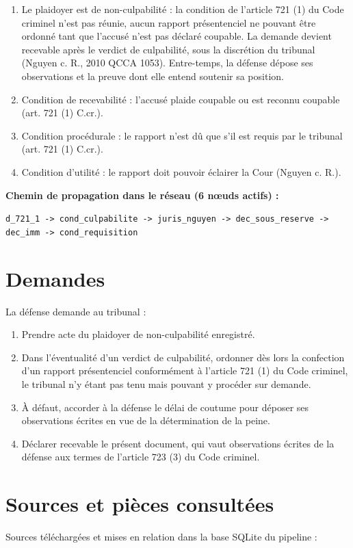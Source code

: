\documentclass[12pt,a4paper]{article}
\begin{document}
\begin{enumerate}[leftmargin=*]
\item Le plaidoyer est de non-culpabilité : la condition de l'article 721 (1) du Code criminel n'est pas réunie, aucun rapport présentenciel ne pouvant être ordonné tant que l'accusé n'est pas déclaré coupable. La demande devient recevable après le verdict de culpabilité, sous la discrétion du tribunal (Nguyen c. R., 2010 QCCA 1053). Entre-temps, la défense dépose ses observations et la preuve dont elle entend soutenir sa position.
\item Condition de recevabilité : l'accusé plaide coupable ou est reconnu coupable (art. 721 (1) C.cr.).
\item Condition procédurale : le rapport n'est dû que s'il est requis par le tribunal (art. 721 (1) C.cr.).
\item Condition d'utilité : le rapport doit pouvoir éclairer la Cour (Nguyen c. R.).
\end{enumerate}

\textbf{Chemin de propagation dans le réseau (6 nœuds actifs) :}

\texttt{d\_721\_1 -> cond\_culpabilite -> juris\_nguyen -> dec\_sous\_reserve -> dec\_imm -> cond\_requisition}


\section{Demandes}
La défense demande au tribunal :

\begin{enumerate}[leftmargin=*]
\item Prendre acte du plaidoyer de non-culpabilité enregistré.
\item Dans l'éventualité d'un verdict de culpabilité, ordonner dès lors la confection d'un rapport présentenciel conformément à l'article 721 (1) du Code criminel, le tribunal n'y étant pas tenu mais pouvant y procéder sur demande.
\item À défaut, accorder à la défense le délai de coutume pour déposer ses observations écrites en vue de la détermination de la peine.
\item Déclarer recevable le présent document, qui vaut observations écrites de la défense aux termes de l'article 723 (3) du Code criminel.
\end{enumerate}

\section{Sources et pièces consultées}
Sources téléchargées et mises en relation dans la base SQLite du pipeline :
\end{document}
